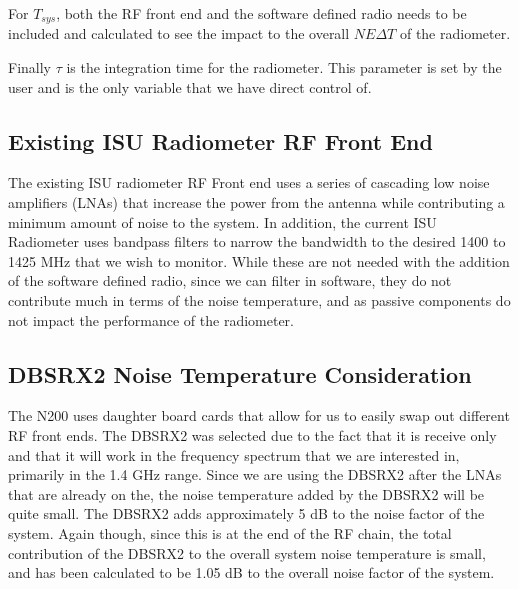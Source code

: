 For $T_{sys}$, both the RF front end and the software defined radio needs to be included and calculated to see the impact to the overall $NE\Delta T$ of the radiometer.  

Finally $\tau$ is the integration time for the radiometer.  This parameter is set by the user and is the only variable that we have direct control of.  

\subsection{Existing ISU Radiometer RF Front End}

The existing ISU radiometer RF Front end uses a series of cascading low noise amplifiers (LNAs) that increase the power from the antenna while contributing a minimum amount of noise to the system.  In addition, the current ISU Radiometer uses bandpass filters to narrow the bandwidth to the desired 1400 to 1425 MHz that we wish to monitor.  While these are not needed with the addition of the software defined radio, since we can filter in software, they do not contribute much in terms of the noise temperature, and as passive components do not impact the performance of the radiometer.

\subsection{DBSRX2 Noise Temperature Consideration}

The N200 uses daughter board cards that allow for us to easily swap out different RF front ends.  The DBSRX2 was selected due to the fact that it is receive only and that it will work in the frequency spectrum that we are interested in, primarily in the 1.4 GHz range.  Since we are using the DBSRX2 after the LNAs that are already on the, the noise temperature added by the DBSRX2 will be quite small.  The DBSRX2 adds approximately 5 dB to the noise factor of the system.  Again though, since this is at the end of the RF chain, the total contribution of the DBSRX2 to the overall system noise temperature is small, and has been calculated to be 1.05 dB to the overall noise factor of the system.

